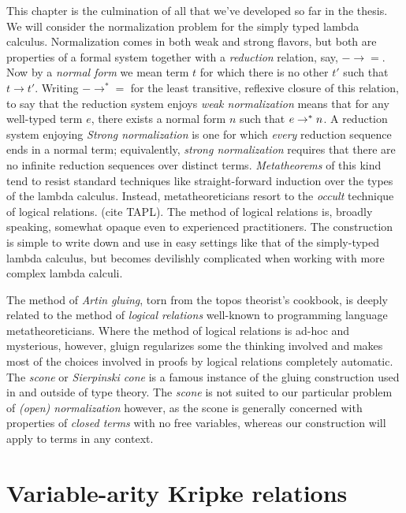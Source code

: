 \documentclass[12pt,twoside]{reedthesis}
\theoremstyle{definition}
\theoremstyle{remark}
\theoremstyle{plain}
\begin{document}
This chapter is the culmination of all that we've developed so far in the
thesis. We will consider the normalization problem for the simply typed lambda
calculus. Normalization comes in both weak and strong flavors, but both are
properties of a formal system together with a \emph{reduction} relation, say,
\( - \rightarrow = \). Now by a \emph{normal form} we mean term $t$ for which there is no
other $t'$ such that \( t \rightarrow t' \). Writing \( - \rightarrow^{*} = \) for the least
transitive, reflexive closure of this relation, to say that the reduction system
enjoys \emph{weak normalization} means that for any well-typed term \( e \),
there exists a normal form \( n \) such that \( e \rightarrow^{*} n\). A reduction system
enjoying \emph{Strong normalization} is one for which \emph{every} reduction
sequence ends in a normal term; equivalently, \emph{strong normalization}
requires that there are no infinite reduction sequences over distinct terms.
\emph{Metatheorems} of this kind tend to resist standard techniques like
straight-forward induction over the types of the lambda calculus. Instead,
metatheoreticians resort to the \emph{occult} technique of logical relations.
(cite TAPL). The method of logical relations is, broadly speaking, somewhat
opaque even to experienced practitioners. The construction is simple to write
down and use in easy settings like that of the simply-typed lambda calculus, but
becomes devilishly complicated when working with more complex lambda calculi.

The method of \emph{Artin gluing}, torn from the topos theorist's cookbook, is
deeply related to the method of \emph{logical relations} well-known to
programming language metatheoreticians. Where the method of logical relations is
ad-hoc and mysterious, however, gluign regularizes some the thinking involved
and makes most of the choices involved in proofs by logical relations completely
automatic. The \emph{scone} or \emph{Sierpinski cone} is a famous instance of
the gluing construction used in and outside of type theory. The \emph{scone} is
not suited to our particular problem of \emph{(open) normalization} however, as
the scone is generally concerned with properties of \emph{closed terms} with no
free variables, whereas our construction will apply to terms in any context.

\section{Variable-arity Kripke relations}
\end{document}
